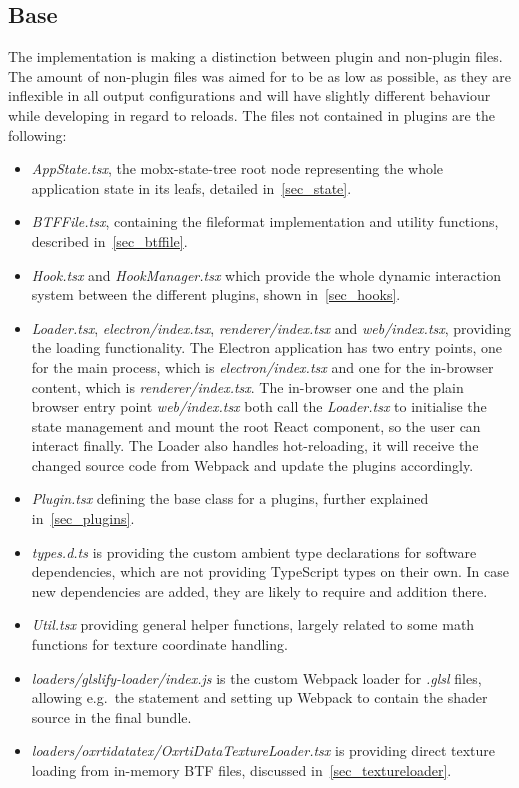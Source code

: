 \subsection{Base}
The implementation is making a distinction between plugin and non-plugin files.
The amount of non-plugin files was aimed for to be as low as possible, as they
are inflexible in all output configurations and will have slightly different
behaviour while developing in regard to reloads. The files not contained in
plugins are the following:
\begin{itemize}
\item \emph{AppState.tsx}, the mobx-state-tree root node representing the whole
  application state in its leafs, detailed in~\autoref{sec_state}.
 \item \emph{BTFFile.tsx}, containing the fileformat implementation and utility
   functions, described in~\autoref{sec_btffile}.
\item \emph{Hook.tsx} and \emph{HookManager.tsx} which provide the whole dynamic
  interaction system between the different plugins, shown
  in~\autoref{sec_hooks}.
\item \emph{Loader.tsx}, \emph{electron/index.tsx}, \emph{renderer/index.tsx}
  and \emph{web/index.tsx}, providing the loading functionality. The Electron
  application has two entry points, one for the main process, which is
  \emph{electron/index.tsx} and one for the in-browser content, which is
  \emph{renderer/index.tsx}. The in-browser one and the plain browser entry point
  \emph{web/index.tsx} both call the \emph{Loader.tsx} to initialise the state
  management and mount the root React component, so the user can interact
  finally. The Loader also handles hot-reloading, it will receive the changed
  source code from Webpack and update the plugins accordingly.
 \item \emph{Plugin.tsx} defining the base class for a plugins, further
   explained in~\autoref{sec_plugins}.
\item \emph{types.d.ts} is providing the custom ambient type declarations for
  software dependencies, which are not providing TypeScript types on their own.
  In case new dependencies are added, they are likely to require and addition there.
\item \emph{Util.tsx} providing general helper functions, largely related to
  some math functions for texture coordinate handling.
\item \emph{loaders/glslify-loader/index.js} is the custom Webpack loader for
  \emph{.glsl} files, allowing e.g.\ the  statement and setting up Webpack to contain the shader source
  in the final bundle.
\item \emph{loaders/oxrtidatatex/OxrtiDataTextureLoader.tsx} is providing direct
  texture loading from in-memory BTF files, discussed in~\autoref{sec_textureloader}.
\end{itemize}

